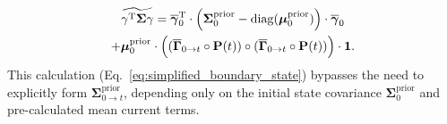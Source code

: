 \documentclass[9pt]{elife}
\begin{document}
	\begin{multline}
		\widetilde{\mathbf{\gamma}^{\mathrm{T}} \mathbf{\Sigma}\mathbf{\gamma}} = \overline{\boldsymbol{\gamma}}_{0}^{\mathrm{T}} \cdot \Bigl( \boldsymbol{\Sigma}^{\text{prior}}_{0} - \mathrm{diag}(\boldsymbol{\mu}^{\text{prior}}_0) \Bigr) \cdot \overline{\boldsymbol{\gamma}}_{0} \\ %
		+ \boldsymbol{\mu}^{\text{prior}}_0 \cdot \Bigl( (\overline{\mathbf{\Gamma}}_{0 \rightarrow t} \circ \mathbf{P}(t)) \circ (\overline{\mathbf{\Gamma}}_{0 \rightarrow t} \circ \mathbf{P}(t)) \Bigr) \cdot \mathbf{1}. 
		\label{eq:simplified_boundary_state} %
	\end{multline}
	This calculation (Eq.~\ref{eq:simplified_boundary_state}) bypasses the need to explicitly form \( \boldsymbol{\Sigma}^{\text{prior}}_{0 \rightarrow t} \), depending only on the initial state covariance \( \boldsymbol{\Sigma}^{\text{prior}}_{0} \) and pre-calculated mean current terms.
	
\end{document}
